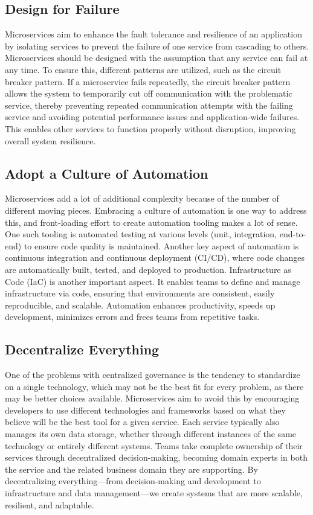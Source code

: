 \subsection{Design for Failure}
Microservices aim to enhance the fault tolerance and resilience of an application by isolating services to prevent the failure of one service from cascading to others. Microservices should be designed with the assumption that any service can fail at any time. To ensure this, different patterns are utilized, such as the circuit breaker pattern. If a microservice fails repeatedly, the circuit breaker pattern allows the system to temporarily cut off communication with the problematic service, thereby preventing repeated communication attempts with the failing service and avoiding potential performance issues and application-wide failures. This enables other services to function properly without disruption, improving overall system resilience.

\subsection{Adopt a Culture of Automation}
Microservices add a lot of additional complexity because of the number of different moving pieces. Embracing a culture of automation is one way to address this, and front-loading effort to create automation tooling makes a lot of sense. One such tooling is automated testing at various levels (unit, integration, end-to-end) to ensure code quality is maintained. Another key aspect of automation is continuous integration and continuous deployment (CI/CD), where code changes are automatically built, tested, and deployed to production. Infrastructure as Code (IaC) is another important aspect. It enables teams to define and manage infrastructure via code, ensuring that environments are consistent, easily reproducible, and scalable. Automation enhances productivity, speeds up development, minimizes errors and frees teams from repetitive tasks.

\subsection{Decentralize Everything}
One of the problems with centralized governance is the tendency to standardize on a single technology, which may not be the best fit for every problem, as there may be better choices available. Microservices aim to avoid this by encouraging developers to use different technologies and frameworks based on what they believe will be the best tool for a given service. Each service typically also manages its own data storage, whether through different instances of the same technology or entirely different systems. Teams take complete ownership of their services through decentralized decision-making, becoming domain experts in both the service and the related business domain they are supporting. By decentralizing everything—from decision-making and development to infrastructure and data management—we create systems that are more scalable, resilient, and adaptable.


